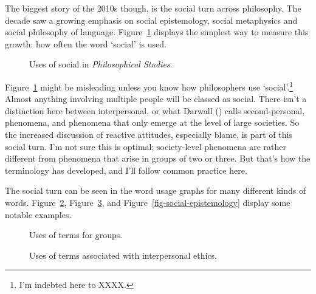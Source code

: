\documentclass[
  10pt,
  letterpaper,
  DIV=11,
  numbers=noendperiod,
  twoside]{scrartcl}
\begin{document}
The biggest story of the 2010s though, is the social turn across
philosophy. The decade saw a growing emphasis on social epistemology,
social metaphysics and social philosophy of language.
Figure~\ref{fig-social} displays the simplest way to measure this
growth: how often the word `social' is used.

\begin{figure}


\caption{\label{fig-social}Uses of social in \emph{Philosophical
Studies}.}

\end{figure}%

Figure~\ref{fig-social} might be misleading unless you know how
philosophers use `social'.\footnote{I'm indebted here to XXXX.} Almost
anything involving multiple people will be classed as social. There
isn't a distinction here between interpersonal, or what Darwall
() calls second-personal, phenomena, and
phenomena that only emerge at the level of large societies. So the
increased discussion of reactive attitudes, especially blame, is part of
this social turn. I'm not sure this is optimal; society-level phenomena
are rather different from phenomena that arise in groups of two or
three. But that's how the terminology has developed, and I'll follow
common practice here.

The social turn can be seen in the word usage graphs for many different
kinds of words. Figure~\ref{fig-social-general},
Figure~\ref{fig-social-ethics}, and Figure~\ref{fig-social-epistemology}
display some notable examples.

\begin{figure}


\caption{\label{fig-social-general}Uses of terms for groups.}

\end{figure}%

\begin{figure}


\caption{\label{fig-social-ethics}Uses of terms associated with
interpersonal ethics.}

\end{figure}%
\end{document}
